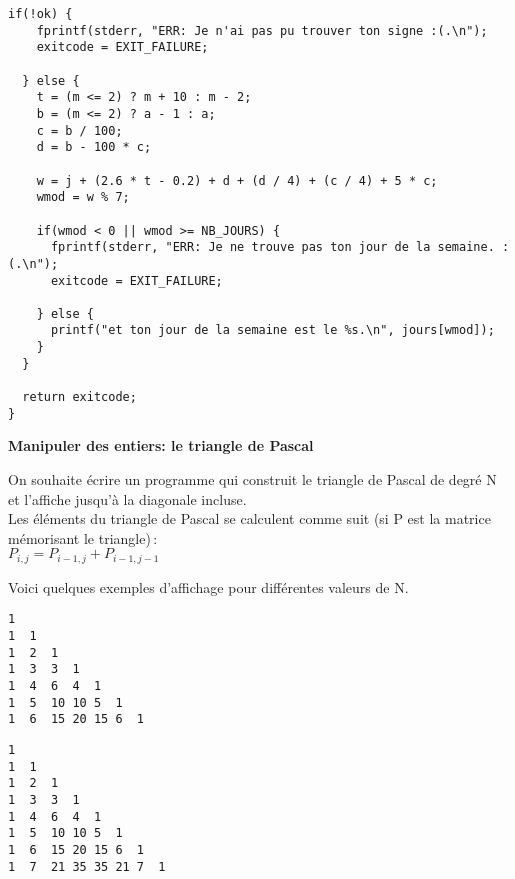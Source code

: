 \documentclass[10pt]{article}\usepackage[correction]{esial}
\begin{document}
\begin{Reponse}
\begin{minipage}{\linewidth}
\begin{Verbatim}[label=Reponse aux 3 questions de l'exercice 2 proposee par Julien]
  if(!ok) {
    fprintf(stderr, "ERR: Je n'ai pas pu trouver ton signe :(.\n");
    exitcode = EXIT_FAILURE;

  } else {
    t = (m <= 2) ? m + 10 : m - 2;
    b = (m <= 2) ? a - 1 : a;
    c = b / 100;
    d = b - 100 * c;

    w = j + (2.6 * t - 0.2) + d + (d / 4) + (c / 4) + 5 * c;
    wmod = w % 7;

    if(wmod < 0 || wmod >= NB_JOURS) {
      fprintf(stderr, "ERR: Je ne trouve pas ton jour de la semaine. :(.\n");
      exitcode = EXIT_FAILURE;

    } else {
      printf("et ton jour de la semaine est le %s.\n", jours[wmod]);
    }
  }

  return exitcode;
}
  \end{Verbatim}
\end{minipage}\hfill


\end{Reponse}



\bigskip\Exercice\textbf{Manipuler des entiers: le triangle de Pascal}

On souhaite écrire un programme qui construit le triangle de Pascal de
degré N et l'affiche jusqu'à la diagonale incluse. \\

Les éléments du triangle de Pascal se calculent comme suit (si P est
la matrice mémorisant le triangle)\,: \\
$P_{i,j} = P_{i-1,j} + P_{i-1,j-1}$

Voici quelques exemples d'affichage pour différentes valeurs de N.

\bigskip\noindent\begin{minipage}{.45\linewidth}
  \begin{Verbatim}[label=Affichage quand N vaut 6]
1 
1  1
1  2  1
1  3  3  1
1  4  6  4  1
1  5  10 10 5  1
1  6  15 20 15 6  1    
  \end{Verbatim}
\end{minipage}\hfill
\begin{minipage}{.45\linewidth}
  \begin{Verbatim}[label=Affichage quand N vaut 7]
1 
1  1
1  2  1
1  3  3  1
1  4  6  4  1
1  5  10 10 5  1
1  6  15 20 15 6  1    
1  7  21 35 35 21 7  1
  \end{Verbatim}
\end{minipage}
\end{document}
